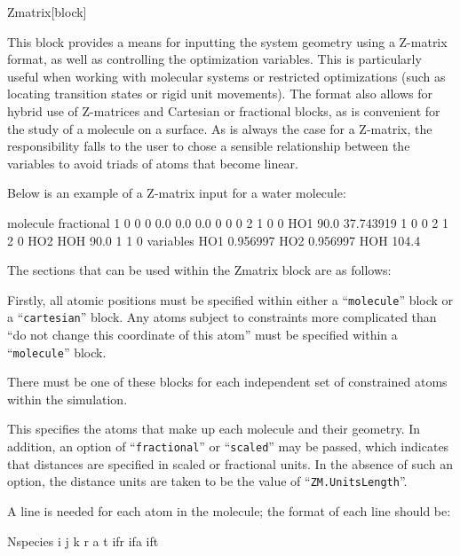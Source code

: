 \begin{fdfentry}{Zmatrix}[block]
  
  This block provides a means for inputting the system geometry using
  a Z-matrix format, as well as controlling the optimization
  variables. This is particularly useful when working with molecular
  systems or restricted optimizations (such as locating transition
  states or rigid unit movements). The format also allows for hybrid
  use of Z-matrices and Cartesian or fractional blocks, as is
  convenient for the study of a molecule on a surface.  As is always
  the case for a Z-matrix, the responsibility falls to the user to
  chose a sensible relationship between the variables to avoid triads
  of atoms that become linear.

  Below is an example of a Z-matrix input for a water molecule:
  \begin{fdfexample}
    molecule fractional
      1 0 0 0   0.0 0.0 0.0 0 0 0
      2 1 0 0   HO1 90.0 37.743919 1 0 0
      2 1 2 0   HO2 HOH 90.0 1 1 0
    variables
        HO1 0.956997
        HO2 0.956997
        HOH 104.4
  \end{fdfexample}

  The sections that can be used within the Zmatrix block are as
  follows:

  Firstly, all atomic positions must be specified within either a
  ``\texttt{molecule}'' block or a ``\texttt{cartesian}'' block.  Any
  atoms subject to constraints more complicated than ``do not change
  this coordinate of this atom'' must be specified within a
  ``\texttt{molecule}'' block.

  \begin{fdfoptions}
    
    \option[molecule]%
    There must be one of these blocks for each independent set of
    constrained atoms within the simulation.
    
    This specifies the atoms that make up each molecule and their
    geometry. In addition, an option of ``\texttt{fractional}'' or
    ``\texttt{scaled}'' may be passed, which indicates that distances are
    specified in scaled or fractional units. In the absence of such an
    option, the distance units are taken to be the value of
    ``\texttt{ZM.UnitsLength}''.

    A line is needed for each atom in the molecule; the format of each
    line should be:
    \begin{fdfexample}
      Nspecies i j k r a t ifr ifa ift
    \end{fdfexample}


\end{fdfoptions}
\end{fdfentry}
